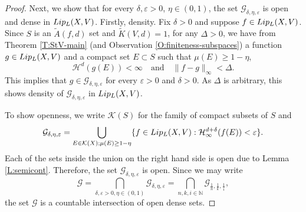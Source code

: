 \documentclass[10pt,a4paper]{amsart}
\def\H{\mathcal{H}}
\def\nat{\mathbb{N}}
\newcommand{\tLip}{\textnormal{Lip}}
\begin{document}
\begin{proof}
    Next, we show that for every $\delta, \varepsilon>0$, $\eta \in (0,1)$, the set $\mathcal{G}_{\delta, \eta, \varepsilon}$ is open and dense in $\tLip_L(X,V)$.
    Firstly, density. Fix $\delta>0$ and suppose $f\in \tLip_L(X,V)$. Since $S$ is an $\tilde{A}(f,d)$ set and $\tilde{K}(V,d)=1$, for any $\Delta>0$, we have from Theorem \ref{T:StV-main} (and Observation \ref{O:finiteness-subspaces}) a function $g\in \tLip_L(X,V)$ and a compact set $E\subset S$ such that $\mu(E)\geq 1-\eta$,
    \begin{equation*}
        \H^d(g(E))< \infty \quad \text{and}\quad \lVert f-g \rVert_{\infty}< \Delta.
    \end{equation*}
    This implies that $g\in \mathcal{G}_{\delta,\eta,\varepsilon}$ for every $\varepsilon>0$ and $\delta>0$. As $\Delta$ is arbitrary, this shows density of $\mathcal{G}_{\delta,\eta,\varepsilon}$ in $\tLip_L(X,V)$.

    To show openness, we write $\mathcal{K}(S)$ for the family of compact subsets of $S$ and
    \begin{equation*}
        \mathcal{G}_{\delta, \eta, \varepsilon}=\bigcup_{E\in \mathcal{K}(X); \mu(E)\geq 1-\eta}\{f\in \tLip_L(X,V): \H^{d+\delta}_\infty(f(E)) < \varepsilon\}.
    \end{equation*}
    Each of the sets inside the union on the right hand side is open due to Lemma \ref{L:semicont}. Therefore, the set $\mathcal{G}_{\delta, \eta, \varepsilon}$ is open.
    Since we may write
    \begin{equation*}
        \mathcal{G}=\bigcap_{\delta, \varepsilon>0, \eta\in(0,1)} \mathcal{G}_{\delta, \eta, \varepsilon}=\bigcap_{n,k,i\in \nat} \mathcal{G}_{\frac{1}{n}, \frac{1}{k}, \frac{1}{i}},
    \end{equation*}
    the set $\mathcal{G}$ is a countable intersection of open dense sets.


\end{proof}
\end{document}
